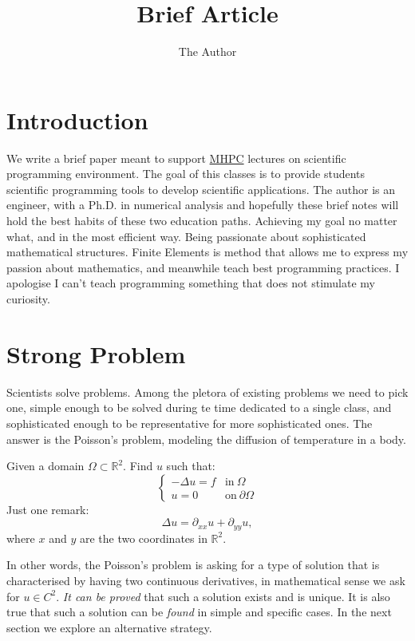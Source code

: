 \documentclass[11pt]{amsart}
\title{Brief Article}
\author{The Author}
\begin{document}
\maketitle

\section{Introduction}
We write a brief paper meant to support \href{http://www.mhpc.it/}{MHPC} 
lectures on scientific programming environment. The goal of this classes 
is to provide students scientific programming tools to develop scientific applications. 
The author is an engineer, with a Ph.D. in numerical analysis and hopefully these brief 
notes will hold the best habits of these two education paths. Achieving my goal no 
matter what, and in the most efficient way. Being passionate about sophisticated 
mathematical structures. Finite Elements is method that allows me to express my passion 
about mathematics, and meanwhile teach best programming practices. I apologise 
I can't teach programming something that does not stimulate my curiosity.

\section{Strong Problem}
Scientists solve problems. Among the pletora of existing problems 
we need to pick one, simple enough to be solved during te time dedicated to a single 
class, and sophisticated enough to be representative for more sophisticated ones. 
The answer is the Poisson's problem,
modeling the diffusion of temperature in a body.

Given a domain $\Omega\subset \mathbb{R}^2$.
Find $u$ such that:
\[
\left\{
\begin{array}{ll}
-\Delta u = f & \mathrm{in}\ \Omega \\
u = 0  & \mathrm{on}\ \partial\Omega
\end{array}
\right.
\]
Just one remark:
\[
\Delta u = \partial_{xx} u + \partial_{yy} u,
\]
where $x$ and $y$ are the two coordinates in $\mathbb{R}^2$.

In other words, the Poisson's problem is asking for a type of solution 
that is characterised by having two continuous derivatives, in mathematical 
sense we ask for $u\in C^2$. \emph{It can be proved} that such a solution exists and 
is unique. It is also true that such a solution can be \emph{found} in simple and
specific cases. In the next section we explore an alternative strategy.
\end{document}
